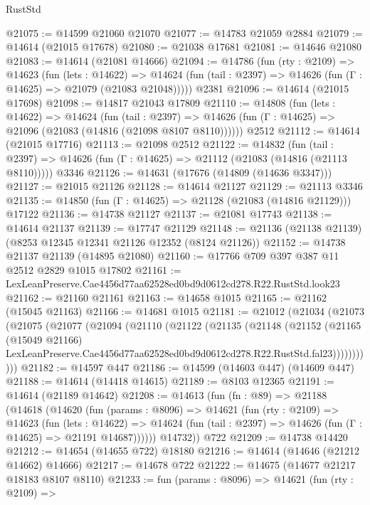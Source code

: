 \begin{lexlean}{RustStd}
\begin{coremodule}
@21075 := @14599 @21060 @21070
@21077 := @14783 @21059 @2884
@21079 := @14614 (@21015 @17678)
@21080 := @21038 @17681
@21081 := @14646 @21080
@21083 := @14614 (@21081 @14666)
@21094 := @14786
    (fun (rty : @2109) =>
    @14623
      (fun (lets : @14622) =>
      @14624 (fun (tail : @2397) => @14626 (fun (Γ : @14625) => @21079 (@21083 @21048)))))
    @2381
@21096 := @14614 (@21015 @17698)
@21098 := @14817 @21043 @17809
@21110 := @14808
    (fun (lets : @14622) =>
    @14624
      (fun (tail : @2397) =>
      @14626 (fun (Γ : @14625) => @21096 (@21083 (@14816 (@21098 @8107 @8110))))))
    @2512
@21112 := @14614 (@21015 @17716)
@21113 := @21098 @2512
@21122 := @14832
    (fun (tail : @2397) => @14626 (fun (Γ : @14625) => @21112 (@21083 (@14816 (@21113 @8110)))))
    @3346
@21126 := @14631 (@17676 (@14809 (@14636 @3347)))
@21127 := @21015 @21126
@21128 := @14614 @21127
@21129 := @21113 @3346
@21135 := @14850 (fun (Γ : @14625) => @21128 (@21083 (@14816 @21129))) @17122
@21136 := @14738 @21127
@21137 := @21081 @17743
@21138 := @14614 @21137
@21139 := @17747 @21129
@21148 := @21136 (@21138 @21139) (@8253 @12345 @12341 @21126 @12352 (@8124 @21126))
@21152 := @14738 @21137 @21139 (@14895 @21080)
@21160 := @17766 @709 @397 @387 @11 @2512 @2829 @1015 @17802
@21161 := LexLeanPreserve.Cae4456d77aa62528ed0bd9d0612cd278.R22.RustStd.look23
@21162 := @21160 @21161
@21163 := @14658 @1015
@21165 := @21162 (@15045 @21163)
@21166 := @14681 @1015
@21181 := @21012
    (@21034
      (@21073
        (@21075
          (@21077
            (@21094
              (@21110
                (@21122
                  (@21135
                    (@21148
                      (@21152
                        (@21165
                          (@15049 @21166)
                          LexLeanPreserve.Cae4456d77aa62528ed0bd9d0612cd278.R22.RustStd.fal23)))))))))))
@21182 := @14597 @447
@21186 := @14599 (@14603 @447) (@14609 @447)
@21188 := @14614 (@14418 @14615)
@21189 := @8103 @12365
@21191 := @14614 (@21189 @14642)
@21208 := @14613
    (fun (fn : @89) =>
    @21188
      (@14618
        (@14620
          (fun (params : @8096) =>
          @14621
            (fun (rty : @2109) =>
            @14623
              (fun (lets : @14622) =>
              @14624 (fun (tail : @2397) => @14626 (fun (Γ : @14625) => @21191 @14687))))))
        @14732))
    @722
@21209 := @14738 @14420
@21212 := @14654 (@14655 @722) @18180
@21216 := @14614 (@14646 (@21212 @14662) @14666)
@21217 := @14678 @722
@21222 := @14675 (@14677 @21217 @18183 @8107 @8110)
@21233 := fun (params : @8096) =>
  @14621
    (fun (rty : @2109) =>

\end{coremodule}
\end{lexlean}
